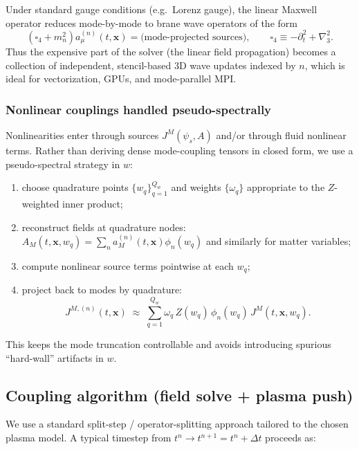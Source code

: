 \documentclass[11pt]{article}
\newcommand{\x}{\mathbf{x}}     %
\newcommand{\lapthree}{\nabla_3^2}
\newcommand{\A}{A}              %
\newcommand{\J}{J}              %
\newcommand{\Z}{Z}              %
\newcommand{\phin}{\phi_n}
\begin{document}
Under standard gauge conditions (e.g.\ Lorenz gauge), the linear Maxwell operator
reduces mode-by-mode to brane wave operators of the form
\begin{equation}
\left(\square_4 + m_n^2\right)a_\mu^{(n)}(t,\x)
= \text{(mode-projected sources)},
\qquad
\square_4\equiv -\partial_t^2+\lapthree.
\label{eq:mode_linear_operator}
\end{equation}
Thus the expensive part of the solver (the linear field propagation) becomes a
collection of independent, stencil-based \(3\)D wave updates indexed by \(n\),
which is ideal for vectorization, GPUs, and mode-parallel MPI.

\subsubsection*{Nonlinear couplings handled pseudo-spectrally}

Nonlinearities enter through sources \(\J^M(\psi_s,\A)\) and/or through fluid
nonlinear terms. Rather than deriving dense mode-coupling tensors in closed form,
we use a pseudo-spectral strategy in \(w\):
\begin{enumerate}[leftmargin=1.6em]
\item choose quadrature points \(\{w_q\}_{q=1}^{Q_w}\) and weights \(\{\omega_q\}\)
appropriate to the \(\Z\)-weighted inner product;
\item reconstruct fields at quadrature nodes:
\(\A_M(t,\x,w_q)=\sum_{n}a_M^{(n)}(t,\x)\phin(w_q)\) and similarly for matter variables;
\item compute nonlinear source terms pointwise at each \(w_q\);
\item project back to modes by quadrature:
\begin{equation}
J^{M,(n)}(t,\x)\;\approx\;\sum_{q=1}^{Q_w}\omega_q\,\Z(w_q)\,\phin(w_q)\,J^M(t,\x,w_q).
\end{equation}
\end{enumerate}
This keeps the mode truncation controllable and avoids introducing spurious
``hard-wall'' artifacts in \(w\).

\subsection{Coupling algorithm (field solve + plasma push)}
\label{sec:coupling_algorithm}

We use a standard split-step / operator-splitting approach tailored to the chosen
plasma model. A typical timestep from \(t^n\to t^{n+1}=t^n+\Delta t\) proceeds as:
\end{document}
